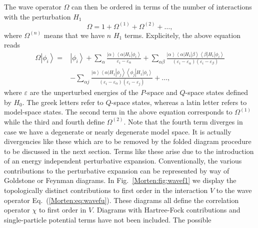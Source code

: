 The wave operator $\Omega$ can then be ordered in terms of the number
of interactions with the perturbation $H_1$
\begin{equation}
              \Omega = 1 +\Omega^{(1)} + \Omega^{(2)}+\dots ,
\end{equation}
where $\Omega^{(n)}$ means that we have $n$ $H_1$ terms. 
Explicitely, the above
equation reads
\begin{eqnarray}
         \Omega\left|\phi_i\right\rangle=
         &{\displaystyle\left|\phi_i\right\rangle
         +\sum_{\alpha}\frac{\left|\alpha\right\rangle
         \left\langle\alpha\right|
          H_1\left|\phi_i\right\rangle}{\varepsilon_i -\varepsilon_{\alpha}}
         +\sum_{\alpha\beta}\frac{\left|\alpha\right\rangle
        \left\langle\alpha\right| H_1
         \left|\beta\right\rangle\left\langle\beta\right| H_1
         \left|\phi_i\right\rangle }
         {(\varepsilon_i-\varepsilon_{\alpha})
       (\varepsilon_i-\varepsilon_{\beta})} }\\   \label{Morten:eq:wavefu}\nonumber
&       {\displaystyle  -\sum_{\alpha j}\frac{\left|\alpha\right\rangle
       \left\langle\alpha\right|
         H_1\left|\phi_j\right\rangle
        \left\langle\phi_j\right| H_1\left|\phi_i\right\rangle}
       {(\varepsilon_i-\varepsilon_{\alpha})
      (\varepsilon_i-\varepsilon_{j})} }
       +\dots ,
\end{eqnarray}
where $\varepsilon$ are the unperturbed energies of the $P$-space
and $Q$-space states defined by $H_0$.
The greek letters refer to
$Q$-space states, whereas a latin letter refers to model-space
states.   The second term
in the above equation corresponds to $\Omega^{(1)}$ while the third
and fourth define $\Omega^{(2)}$.
Note that the fourth term diverges
in case we have a degenerate or nearly degenerate model space. It is
actually divergencies like these which are to be removed by the folded
diagram procedure to be discussed in the next section. Terms like these
arise due to the introduction of an energy independent perturbative
expansion. Conventionally, the various contributions to the
perturbative expansion can be  represented by way of Goldstone 
or Feynman diagrams.
In Fig.~\ref{Morten:fig:wavef1} we display the topologically distinct
contributions to first order in the
interaction $V$ to
the wave operator Eq.~(\ref{Morten:eq:wavefu}). These diagrams all
define the correlation operator $\chi$ to first order in $V$.
Diagrams with Hartree-Fock contributions 
and single-particle potential terms 
have not been included. The possible 
